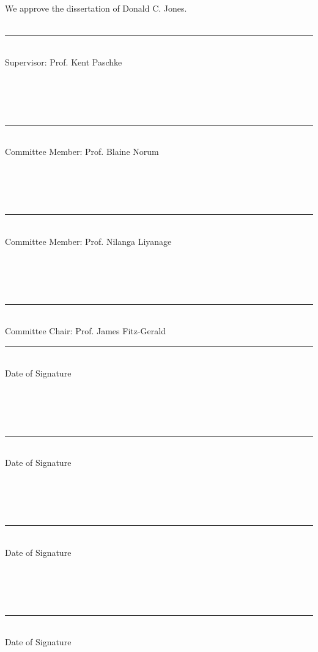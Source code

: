 \documentclass[11pt, twoside]{Thesis} %
\begin{document}
\clearpage %
\vspace{1cm}
\large We approve the dissertation of Donald C. Jones.\\
\vspace{1cm}~\\
\begin{minipage}{0.7\textwidth}
\rule[1em]{20em}{0.5pt}\\%
Supervisor: Prof. Kent Paschke\\ 
~\\~\\~\\~\\
\rule[1em]{20em}{0.5pt}\\%
Committee Member: Prof. Blaine Norum\\ 
~\\~\\~\\~\\
\rule[1em]{20em}{0.5pt}\\%
Committee Member: Prof. Nilanga Liyanage\\ 
~\\~\\~\\~\\
\rule[1em]{20em}{0.5pt}\\%
Committee Chair: Prof. James Fitz-Gerald\\ 
\end{minipage}
\begin{minipage}{0.3\textwidth}
\rule[1em]{10em}{0.5pt}\\%
Date of Signature\\ 
~\\~\\~\\~\\
\rule[1em]{10em}{0.5pt}\\%
Date of Signature\\ 
~\\~\\~\\~\\
\rule[1em]{10em}{0.5pt}\\%
Date of Signature\\ 
~\\~\\~\\~\\
\rule[1em]{10em}{0.5pt}\\%
Date of Signature\\ 
\end{minipage}
\end{document}
